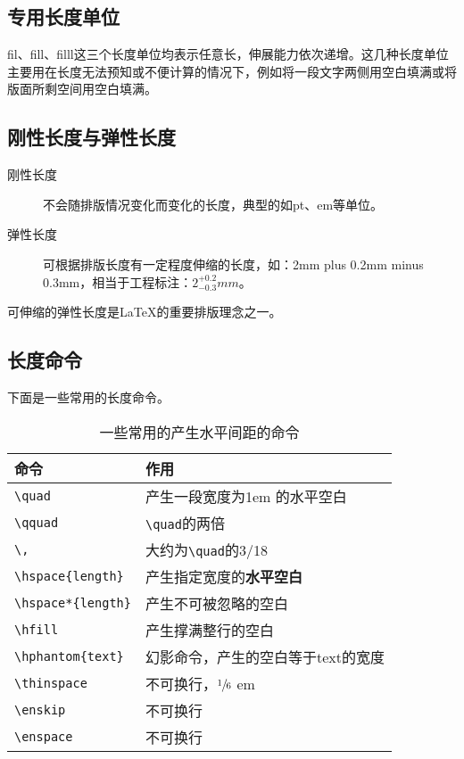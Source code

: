 \subsection*{专用长度单位}
fil、fill、filll这三个长度单位均表示任意长，伸展能力依次递增。这几种长度单位主要用在长度无法预知或不便计算的情况下，例如将一段文字两侧用空白填满或将版面所剩空间用空白填满。

\subsection*{刚性长度与弹性长度}

\begin{description}
    \item[刚性长度] 不会随排版情况变化而变化的长度，典型的如pt、em等单位。
    \item[弹性长度] 可根据排版长度有一定程度伸缩的长度，如：2mm plus 0.2mm minus 0.3mm，相当于工程标注：$ 2^{+0.2}_{-0.3}mm $。
\end{description}

可伸缩的弹性长度是\LaTeX 的重要排版理念之一。

\subsection*{长度命令}
下面是一些常用的长度命令。

\begin{table}[!htbp]
    \centering
    \caption{一些常用的产生水平间距的命令}
    \begin{tabular}{ll}
        \toprule
        命令 & 作用\\
        \midrule
        \verb|\quad| & 产生一段宽度为1em 的水平空白\\
        \verb|\qquad| & \verb|\quad|的两倍\\
        \verb|\,| & 大约为\verb|\quad|的3/18\\
        \verb|\hspace{length}| & 产生指定宽度的\textbf{水平空白}\\
        \verb|\hspace*{length}| & 产生不可被忽略的空白\\
        \verb|\hfill| & 产生撑满整行的空白\\
        \verb|\hphantom{text}| & 幻影命令，产生的空白等于text的宽度\\
        \verb|\thinspace| & 不可换行，$ \sfrac{1}{6} $ em\\
        \verb|\enskip| & 不可换行\\
        \verb|\enspace| & 不可换行\\
        \bottomrule
    \end{tabular}
\end{table}

